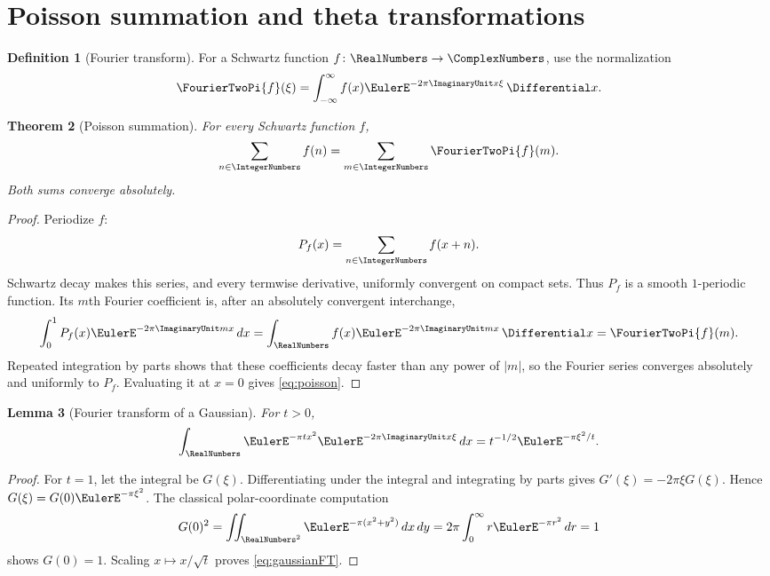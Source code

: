 \documentclass[11pt]{article}
\numberwithin{equation}{section}
\newtheorem{theorem}{Theorem}[section]
\newtheorem{lemma}[theorem]{Lemma}
\theoremstyle{definition}
\newtheorem{definition}[theorem]{Definition}
\theoremstyle{remark}
\begin{document}
\section{Poisson summation and theta transformations}

\begin{definition}[Fourier transform]
For a Schwartz function $f\colon\RealNumbers\to\ComplexNumbers$, use the normalization
\[
\FourierTwoPi{f}(\xi)=\int_{-\infty}^{\infty}f(x)\EulerE^{-2\pi\ImaginaryUnit x\xi}\,\Differential x.
\]
\end{definition}

\begin{theorem}[Poisson summation]\label{thm:poisson}
For every Schwartz function $f$,
\begin{equation}\label{eq:poisson}
\sum_{n\in\IntegerNumbers}f(n)=\sum_{m\in\IntegerNumbers}\FourierTwoPi{f}(m).
\end{equation}
Both sums converge absolutely.
\end{theorem}
\begin{proof}
Periodize $f$:
\[
P_f(x)=\sum_{n\in\IntegerNumbers}f(x+n).
\]
Schwartz decay makes this series, and every termwise derivative, uniformly
convergent on compact sets.  Thus $P_f$ is a smooth $1$-periodic function.
Its $m$th Fourier coefficient is, after an absolutely convergent interchange,
\[
\int_0^1P_f(x)\EulerE^{-2\pi\ImaginaryUnit mx}\,dx
=\int_{\RealNumbers}f(x)\EulerE^{-2\pi\ImaginaryUnit mx}\,\Differential x=\FourierTwoPi{f}(m).
\]
Repeated integration by parts shows that these coefficients decay faster
than any power of $|m|$, so the Fourier series converges absolutely and
uniformly to $P_f$.  Evaluating it at $x=0$ gives \eqref{eq:poisson}.
\end{proof}

\begin{lemma}[Fourier transform of a Gaussian]\label{lem:gaussianFT}
For $t>0$,
\begin{equation}\label{eq:gaussianFT}
\int_{\RealNumbers}\EulerE^{-\pi t x^2}\EulerE^{-2\pi\ImaginaryUnit x\xi}\,dx
=t^{-1/2}\EulerE^{-\pi\xi^2/t}.
\end{equation}
\end{lemma}
\begin{proof}
For $t=1$, let the integral be $G(\xi)$.  Differentiating under the integral
and integrating by parts gives
$G'(\xi)=-2\pi\xi G(\xi)$.  Hence
$G(\xi)=G(0)\EulerE^{-\pi\xi^2}$.  The classical polar-coordinate computation
\[
G(0)^2=\iint_{\RealNumbers^2}\EulerE^{-\pi(x^2+y^2)}\,dx\,dy
=2\pi\int_0^\infty r\EulerE^{-\pi r^2}\,dr=1
\]
shows $G(0)=1$.  Scaling $x\mapsto x/\sqrt t$ proves
\eqref{eq:gaussianFT}.
\end{proof}
\end{document}
